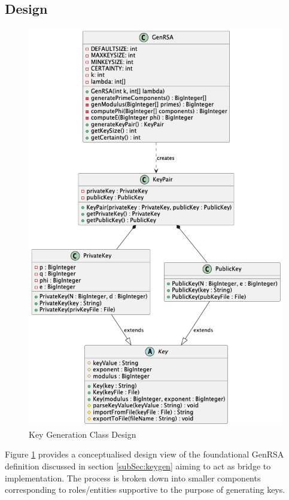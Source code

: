 \documentclass[]{final_report}
\theoremstyle{definition}
\begin{document}
\subsection{Design}
\begin{figure}[H]
    \centering
    \includegraphics[scale=0.48]{poc_pictures/KeyGeneration.png}
    \caption{Key Generation Class Design}
    \label{fig:kg}
\end{figure}

Figure \ref{fig:kg} provides a conceptualised design view of the foundational GenRSA definition discussed in section  \ref{subSec:keygen} aiming to act as bridge to implementation. The process is broken down into smaller components corresponding to roles/entities supportive to the purpose of generating keys. 
\end{document}
